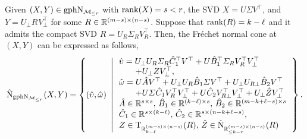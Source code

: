 \begin{corollary}\label{cor:Fnormal_graph_1}
    Given $(X,Y)\in\mathrm{gph}\mathrm{N}_{\mathcal{M}_{\le r}}$ with $\operatorname{rank}(X)=s<r$, the SVD $X=U\varSigma V^\top$, and $Y=U^{}_{\bot} R_{}^{}V_{\bot}^\top$ for some $R\in\mathbb{R}^{(m-s)\times (n-s)}$. Suppose that $\operatorname{rank}(R)=k-\ell$ and it admits the compact SVD $R=U_R\varSigma_RV_R^\top$. Then, the Fr\'echet normal cone at $(X,Y)$ can be expressed as follows,
    \begin{equation}\label{eq:Fnormal_graph_deficient}
        \hat{\mathrm{N}}_{\mathrm{gph}\mathrm{N}_{\mathcal{M}_{\le r}}}(X,Y)=\left\{ { (\hat{\upsilon},\hat{\omega})\ \left|\,\begin{array}{l}
            \hat{\upsilon} =  U_\bot U_R\varSigma_R\hat{C}_1^\top V^\top + U\hat{B}_1^\top \varSigma_RV_R^\top V_\bot^\top
            \\
            \hspace{7mm}+ U_\bot Z V^\top_\bot,
           \\
           \hat{\omega} = U\hat{A}V^\top + U_\bot U_R\hat{B}_1\varSigma V^\top + U_\bot U_{R\bot}\hat{B}_2 V^\top 
           \\
           \hspace{7mm}+ U \varSigma\hat{C}_1V_R^\top V_\bot^\top+ U \hat{C}_2V_{R\bot}^\top V_\bot^\top + U_\bot\hat{Z} V_\bot^\top
            \\
            \hat{A}\in\mathbb{R}^{s\times s},\,\hat{B}_1\in\mathbb{R}^{(k-\ell)\times s},\,\hat{B}_2\in\mathbb{R}^{(m-k+\ell-s)\times s}
            \\
            \hat{C}_1\in\mathbb{R}^{s\times (k-\ell)},\,\hat{C}_2\in\mathbb{R}^{s\times(n-k+\ell-s)},
            \\
            {Z}\in \mathrm{T}_{\mathbb{R}^{(m-s)\times(n-s)}_{k-\ell}}(R),\,\hat{Z}\in\hat{\mathrm{N}}_{\mathbb{R}^{(m-s)\times(n-s)}_{\le k-r}}(R)
        \end{array} \right.
        } \right\}.
    \end{equation}
\end{corollary}
